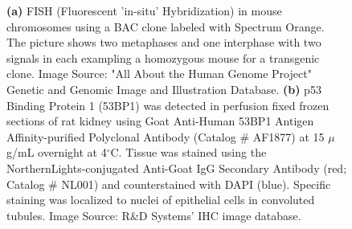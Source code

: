 %

\begin{figure}[!t]
	\centering
	\caption{\textbf{(a)} FISH (Fluorescent 'in-situ' Hybridization) in mouse chromosomes using a BAC clone labeled with Spectrum Orange. The picture shows two metaphases and one interphase with two signals in each exampling a homozygous mouse for a transgenic clone. Image Source: "All About the Human Genome Project" Genetic and Genomic Image and Illustration Database. %
	\textbf{(b)} p53 Binding Protein 1 (53BP1) was detected in perfusion fixed frozen sections of rat kidney using Goat Anti-Human 53BP1 Antigen Affinity-purified Polyclonal Antibody (Catalog \# AF1877) at 15 $\mu$g/mL overnight at 4$^{\circ}$C. Tissue was stained using the NorthernLights-conjugated Anti-Goat IgG Secondary Antibody (red; Catalog \# NL001) and counterstained with DAPI (blue). Specific staining was localized to nuclei of epithelial cells in convoluted tubules. Image Source: R\&D Systems' IHC image database.}
	\label{fig:stainingtechniques}
\end{figure}

